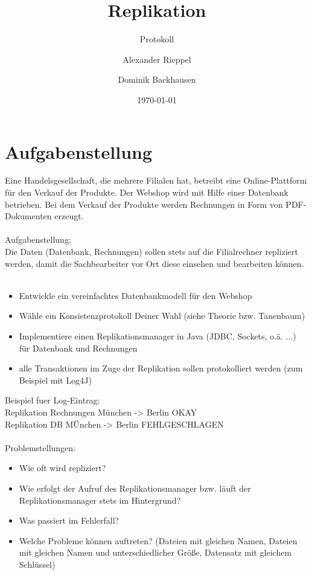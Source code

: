 \documentclass[a4paper,12pt]{scrreprt}
\begin{document}
\author{Alexander Rieppel \and Dominik Backhausen} %
\title{ Replikation } %
\subject{VSDB} %
\subtitle{ Protokoll } %
\date{\today} %
\publishers{5AHITT} %

\maketitle
\tableofcontents


\chapter{Aufgabenstellung}
	Eine Handelsgesellschaft, die mehrere Filialen hat, betreibt eine Online-Plattform für den Verkauf der Produkte. Der Webshop wird mit Hilfe einer Datenbank betrieben. Bei dem Verkauf der Produkte werden Rechnungen in Form von PDF-Dokumenten erzeugt.\\\\
	Aufgabenstellung:\\
	Die Daten (Datenbank, Rechnungen) sollen stets auf die Filialrechner repliziert werden, damit die Sachbearbeiter vor Ort diese einsehen und bearbeiten können.\\\\
	\begin{itemize}
	\item Entwickle ein vereinfachtes Datenbankmodell für den Webshop
	\item Wähle ein Konsistenzprotokoll Deiner Wahl (siehe Theorie bzw. Tanenbaum)
	\item Implementiere einen Replikationsmanager in Java (JDBC, Sockets, o.ä. ...) für Datenbank und Rechnungen
	\item alle Transaktionen im Zuge der Replikation sollen protokolliert werden (zum Beispiel mit Log4J)
	\end{itemize}
	Beispiel fuer Log-Eintrag:\\
	Replikation Rechnungen München -> Berlin OKAY\\
	Replikation DB MÜnchen -> Berlin FEHLGESCHLAGEN\\\\
	Problemstellungen:
	\begin{itemize}
	\item Wie oft wird repliziert?
	\item Wie erfolgt der Aufruf des Replikationsmanager bzw. läuft der Replikationsmanager stets im Hintergrund?
	\item Was passiert im Fehlerfall?
	\item Welche Probleme können auftreten? (Dateien mit gleichen Namen, Dateien mit gleichen Namen und unterschiedlicher Größe, Datensatz mit gleichem Schlüssel)
	\end{itemize}
\end{document}
